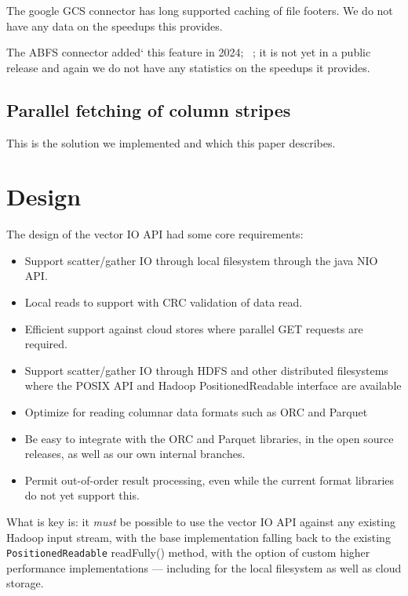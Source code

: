 \documentclass[manuscript]{acmart}
\begin{document}
The google GCS connector has long supported caching of file footers.
We do not have any data on the speedups this provides.

The ABFS connector added` this feature in 2024;
\ \cite{HADOOP-18971}; it is not yet in a public release and
again we do not have any statistics on the speedups it provides.


\subsection{Parallel fetching of column stripes}\label{subsec:parallel-fetching-of-column-stripes}

This is the solution we implemented and which this paper describes.




\section{Design}
\label{sec:design}

The design of the vector IO API had some core requirements:
\begin{itemize}
  \item Support scatter/gather IO through local filesystem through the java NIO API.
  \item Local reads to support with CRC validation of data read.
  \item Efficient support against cloud stores where parallel GET requests are required.
  \item Support scatter/gather IO through HDFS and other distributed filesystems
        where the POSIX API and Hadoop PositionedReadable interface are available
  \item Optimize for reading columnar data formats such as ORC and Parquet
  \item Be easy to integrate with the ORC and Parquet libraries, in the open
        source releases, as well as our own internal branches.
  \item Permit out-of-order result processing, even while the current format libraries
        do not yet support this.
\end{itemize}

What is key is: it \emph{must} be possible to use the vector IO API against
any existing Hadoop input stream, with the base implementation
falling back to the existing \texttt{PositionedReadable} readFully() method,
with the option of custom higher performance implementations --- including
for the local filesystem as well as cloud storage.
\end{document}
